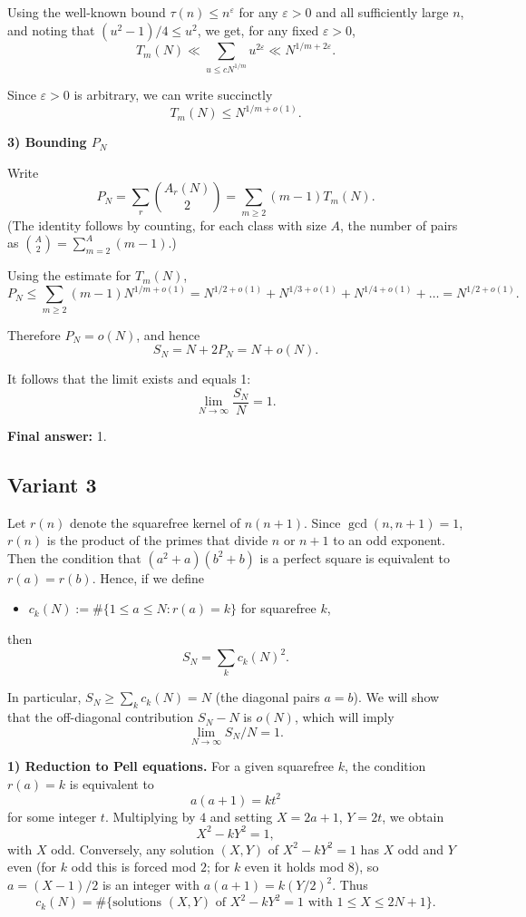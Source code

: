 \documentclass[12pt,a4paper]{article}
\theoremstyle{definition}
\begin{document}
    Using the well-known bound $\tau(n) \leq n^\varepsilon$ for any $\varepsilon > 0$ and all sufficiently large $n$, and noting that $(u^2 - 1)/4 \leq u^2$, we get, for any fixed $\varepsilon > 0$,
    $$T_m(N) \ll \sum_{u \leq c N^{1/m}} u^{2\varepsilon} \ll N^{1/m + 2\varepsilon}.$$

    Since $\varepsilon > 0$ is arbitrary, we can write succinctly
    $$T_m(N) \leq N^{1/m + o(1)}.$$

    \textbf{3) Bounding $P_N$}

    Write
    $$P_N = \sum_r \binom{A_r(N)}{2} = \sum_{m \geq 2} (m - 1) T_m(N).$$
    (The identity follows by counting, for each class with size $A$, the number of pairs as $\binom{A}{2} = \sum_{m=2}^A (m - 1)$.)

    Using the estimate for $T_m(N)$,
    $$P_N \leq \sum_{m \geq 2} (m - 1) N^{1/m + o(1)} = N^{1/2 + o(1)} + N^{1/3 + o(1)} + N^{1/4 + o(1)} + \ldots = N^{1/2 + o(1)}.$$

    Therefore $P_N = o(N)$, and hence
    $$S_N = N + 2P_N = N + o(N).$$

    It follows that the limit exists and equals 1:
    $$\lim_{N\to\infty} \frac{S_N}{N} = 1.$$

    \textbf{Final answer:} 1.
    \subsection{Variant 3}
    Let $r(n)$ denote the squarefree kernel of $n(n+1)$. Since $\gcd(n,n+1)=1$, $r(n)$ is the product of the primes that divide $n$ or $n+1$ to an odd exponent. Then the condition that $(a^2+a)(b^2+b)$ is a perfect square is equivalent to $r(a)=r(b)$. Hence, if we define
    \begin{itemize}
        \item $c_k(N) := \#\{1 \leq a \leq N : r(a)=k\}$ for squarefree $k$,
    \end{itemize}
    then
    $$S_N = \sum_k c_k(N)^2.$$

    In particular, $S_N \geq \sum_k c_k(N) = N$ (the diagonal pairs $a=b$). We will show that the off-diagonal contribution $S_N - N$ is $o(N)$, which will imply
    $$\lim_{N\to\infty} S_N/N = 1.$$

    \textbf{1) Reduction to Pell equations.} For a given squarefree $k$, the condition $r(a)=k$ is equivalent to
    $$a(a+1) = k t^2$$
    for some integer $t$. Multiplying by $4$ and setting $X=2a+1$, $Y=2t$, we obtain
    $$X^2 - k Y^2 = 1,$$
    with $X$ odd. Conversely, any solution $(X,Y)$ of $X^2 - k Y^2 = 1$ has $X$ odd and $Y$ even (for $k$ odd this is forced mod $2$; for $k$ even it holds mod $8$), so $a=(X-1)/2$ is an integer with $a(a+1)=k (Y/2)^2$. Thus
    $$c_k(N) = \#\{\text{solutions } (X,Y) \text{ of } X^2 - k Y^2 = 1 \text{ with } 1 \leq X \leq 2N+1\}.$$
\end{document}
